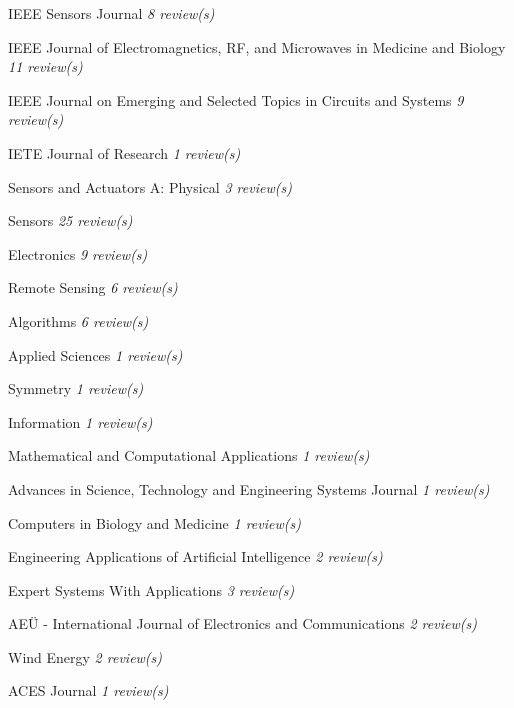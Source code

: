 {\begin{cvitems}
        \item {IEEE Sensors Journal \hfill \bodyfontlight\slshape\color{awesome} 8 review(s)}
        \item {IEEE Journal of Electromagnetics, RF, and Microwaves in Medicine and Biology \hfill \bodyfontlight\slshape\color{awesome} 11 review(s)}
        \item {IEEE Journal on Emerging and Selected Topics in Circuits and Systems \hfill \bodyfontlight\slshape\color{awesome} 9 review(s)}
        \item {IETE Journal of Research \hfill \bodyfontlight\slshape\color{awesome} 1 review(s)}
        \item {Sensors and Actuators A: Physical \hfill \bodyfontlight\slshape\color{awesome} 3 review(s)}
        \item {Sensors \hfill \bodyfontlight\slshape\color{awesome} 25 review(s)}
        \item {Electronics \hfill \bodyfontlight\slshape\color{awesome} 9 review(s)}
        \item {Remote Sensing \hfill \bodyfontlight\slshape\color{awesome} 6 review(s)}
        \item {Algorithms \hfill \bodyfontlight\slshape\color{awesome} 6 review(s)}
        \item {Applied Sciences \hfill \bodyfontlight\slshape\color{awesome} 1 review(s)}
        \item {Symmetry \hfill \bodyfontlight\slshape\color{awesome} 1 review(s)}
        \item {Information \hfill \bodyfontlight\slshape\color{awesome} 1 review(s)}
        \item {Mathematical and Computational Applications \hfill \bodyfontlight\slshape\color{awesome} 1 review(s)}
        \item {Advances in Science, Technology and Engineering Systems Journal \hfill \bodyfontlight\slshape\color{awesome} 1 review(s)}
        \item {Computers in Biology and Medicine \hfill \bodyfontlight\slshape\color{awesome} 1 review(s)}
        \item {Engineering Applications of Artificial Intelligence \hfill \bodyfontlight\slshape\color{awesome} 2 review(s)}
        \item {Expert Systems With Applications \hfill \bodyfontlight\slshape\color{awesome} 3 review(s)}
        \item {AEÜ - International Journal of Electronics and Communications \hfill \bodyfontlight\slshape\color{awesome} 2 review(s)}
        \item {Wind Energy \hfill \bodyfontlight\slshape\color{awesome} 2 review(s)}
        \item {ACES Journal \hfill \bodyfontlight\slshape\color{awesome} 1 review(s)}
        
        \vspace{4.0mm}
    \end{cvitems}
}

